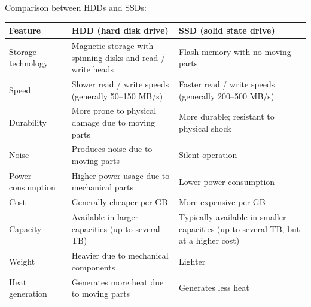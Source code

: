 Comparison between HDDs and SSDs:
\begin{center}
\begin{tabular}{|p{4cm}|p{6.5cm}|p{6.5cm}|}
        \hline
        \textbf{Feature} & \textbf{HDD (hard disk drive)} & \textbf{SSD (solid state drive)} \\
        \hline
        Storage technology & Magnetic storage with spinning disks and read / write heads & Flash memory with no moving parts \\
        \hline
        Speed & Slower read / write speeds (generally 50--150 MB/s) & Faster read / write speeds (generally 200--500 MB/s) \\
        \hline
        Durability & More prone to physical damage due to moving parts & More durable; resistant to physical shock \\
        \hline
        Noise & Produces noise due to moving parts & Silent operation \\
        \hline
        Power consumption & Higher power usage due to mechanical parts & Lower power consumption \\
        \hline
        Cost & Generally cheaper per GB & More expensive per GB \\
        \hline
        Capacity & Available in larger capacities (up to several TB) & Typically available in smaller capacities (up to several TB, but at a higher cost) \\
        \hline
        Weight & Heavier due to mechanical components & Lighter \\
        \hline
        Heat generation & Generates more heat due to moving parts & Generates less heat \\
        \hline
    \end{tabular}
\end{center}

